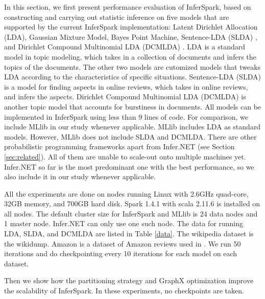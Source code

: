 In this section, we first present performance evaluation of InferSpark, 
based on constructing and carrying out statistic inference on five models that
are supported by the current InferSpark implementation: 
Latent Dirichlet Allocation (LDA), Gaussian Mixture Model, Bayes Point
Machine, Sentence-LDA (SLDA) \cite{Jo2011}, and Dirichlet Compound Multinomial
LDA (DCMLDA) \cite{Doyle2009}.
LDA is a standard model in topic modeling, which takes in a collection of documents
and infers the topics of the documents.  
The other two models are cutomized models that tweaks LDA according to the
characteristics of specific situations.
Sentence-LDA (SLDA) is a model for finding aspects in online reviews, which takes in online reviews, and infers the aspects.
Dirichlet Compound Multinomial LDA (DCMLDA) is another topic model that accounts for burstiness in documents.
All models can be implemented in InferSpark using less than 9 lines of code. 
For comparison, we include MLlib in our study whenever applicable.
MLlib includes LDA as standard models.  However, MLlib does not include SLDA and DCMLDA.
There are other probabilistic programming frameworks apart from Infer.NET (see Section \ref{sec:related}).
All of them are unable to scale-out onto multiple machines yet.  
Infer.NET so far is the most predominant one with the best performance, so we also include it in our study whenever applicable.

All the experiments are done on nodes running Linux with 2.6GHz quad-core, 32GB memory, and 700GB hard disk. 
Spark 1.4.1 with scala 2.11.6 is installed on all nodes.
The default cluster size for InferSpark and MLlib is 24 data nodes and 1 master node.
Infer.NET can only use one such node.
The data for running LDA, SLDA, and DCMLDA are listed in Table \ref{data}.
The wikipedia dataset is the wikidump. Amazon is a dataset of Amazon reviews
used in \cite{Jo2011}.
We run 50 iterations and do checkpointing every 10 iterations for each model on each dataset.

Then we show how the partitioning strategy and GraphX optimization improve the
scalability of InferSpark. In these experiments, no checkpoints are taken.



